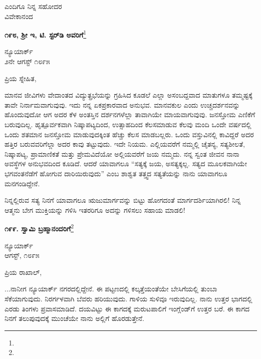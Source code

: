 \vspace{-0.5cm}

{\flushright
ಎಂದಿಗೂ ನಿನ್ನ ಸಹೋದರ\\ವಿವೇಕಾನಂದ\par}

\begin{center}
\textbf{೧೯೮, ಶ‍್ರೀ ಇ, ಟಿ. ಸ್ಟರ್‌ಡಿ ಅವರಿಗೆ}\footnote{}
\end{center}

\vspace{-0.5cm}

\begin{flushright}
ನ್ಯೂಯಾರ್ಕ್\\೨ನೇ ಆಗಸ್ಟ್ ೧೮೯೫
\end{flushright}

\noindent
ಪ್ರಿಯ ಸ್ನೇಹಿತ,

ಮಾನವ ಜೀವಿಗಳು ವೇದಾಂತದ ವಿದ್ಯುತ್ಪ್ರಭೆಯನ್ನು ಗ್ರಹಿಸಿದ ಕೂಡಲೆ ಎಲ್ಲಾ ಅಸಂಬದ್ದವಾದ ಮಾತುಗಳೂ ತಮ್ಮಷ್ಟಕ್ಕೆ ತಾವೇ ನಿರ್ನಾಮವಾಗುವುವು. ಇದು ನನ್ನ ಏಕ\break ಪ್ರಕಾರವಾದ ಅನುಭವ. ಮಾನವಕುಲ ಎಂದು ಉಚ್ಚದರ್ಶನವನ್ನು ಹೊಂದುವುದೋ ಆಗ ಅದರ ಕೆಳ ಅಂತಸ್ತಿನ ದರ್ಶನಗಳೆಲ್ಲಾ ತಾವಾಗಿಯೇ ಮಾಯವಾಗುವುವು. ಜನಸ್ತೋಮ ಎಣಿಕೆಗೆ ಬರುವುದಿಲ್ಲ. ಹೃತ್ಪೂರ್ವಕವಾಗಿ ನಿಷ್ಕಾಪಟ್ಯದಿಂದ, ಉತ್ಸಾಹದಿಂದ ಕೆಲಸ\break ಮಾಡುವ ಕೆಲವು ಮಂದಿ ಒಂದೇ ವರ್ಷದಲ್ಲಿ ಒಂದು ಶತಮಾನ ಜನಸ್ತೋಮ ಮಾಡುವುದಕ್ಕಿಂತ ಹೆಚ್ಚು ಕೆಲಸ ಮಾಡಬಲ್ಲರು. ಒಂದು ವಸ್ತುವಿನಲ್ಲಿ ಕಾವಿದ್ದರೆ ಅದರ ಹತ್ತಿರ ಬರುವವರಿಗೆಲ್ಲಾ ಅದರ ಕಾವು ತಟ್ಟುವುದು. ಇದೇ ನಿಯಮ. ಎಲ್ಲಿಯವರೆಗೆ ನಮ್ಮಲ್ಲಿ ಚೈತನ್ಯ, ಸತ್ಯಶೀಲತೆ, ನಿಷ್ಕಾಪಟ್ಯ, ಪ್ರಾಮಾಣಿಕತೆ ಮತ್ತು ಪ್ರೇಮವಿದೆಯೋ ಅಲ್ಲಿಯವರೆಗೆ ಜಯ ನಮ್ಮದು. ನನ್ನ ಸ್ವಂತ ಜೀವನ ನಾನಾ ಅವಸ್ಥೆಗಳ ಅನುಭವದಿಂದ ಕೂಡಿದೆ. ಆದರೆ ಯಾವಾಗಲೂ ``ಸತ್ಯಕ್ಕೆ ಜಯ, ಅಸತ್ಯಕ್ಕಲ್ಲ. ಸತ್ಯದ ಮೂಲಕವಾಗಿಯೇ ಭಗವಂತನೆಡೆಗೆ ಹೋಗುವ ದಾರಿಯಿರುವುದು” ಎಂಬ ಶಾಶ್ವತ ತತ್ತ್ವದ ಸತ್ಯತೆಯನ್ನು ನಾನು ಯಾವಾಗಲೂ ಮನಗಂಡಿದ್ದೇನೆ.

ನಿನ್ನಲ್ಲಿರುವ ಸತ್ಯ ನಿನಗೆ ಯಾವಾಗಲೂ ಋಜುಮಾರ್ಗವನ್ನು ಬಿಟ್ಟು ಹೋಗದಂತೆ ಮಾರ್ಗದರ್ಶಿಯಾಗಿರಲಿ! ನಿನ್ನ ಆತ್ಮನು ಬೇಗ ಮುಕ್ತಿಯನ್ನು ಗಳಿಸಿ ಇತರರಿಗೂ ಅದನ್ನು ಗಳಿಸಲು ಸಹಾಯ ಮಾಡಲಿ!

\begin{center}
\textbf{೧೯೯. ಸ್ವಾಮಿ ಬ್ರಹ್ಮಾನಂದರಿಗೆ}\footnote{}
\end{center}

\vspace{-0.3cm}

\begin{flushright}
ನ್ಯೂಯಾರ್ಕ್\\ಆಗಸ್ಟ್, ೧೮೯೫
\end{flushright}

\noindent
ಪ್ರಿಯ ರಾಖಾಲ್,

...ನಾನೀಗ ನ್ಯೂಯಾರ್ಕ್ ನಗರದಲ್ಲಿದ್ದೇನೆ. ಈ ಪಟ್ಟಣದಲ್ಲಿ ಕಲ್ಕತ್ತೆಯಂತೆಯೇ ಬೇಸಿಗೆಯಲ್ಲಿ ತುಂಬಾ ಸೆಕೆಯಾಗುವುದು. ನಿರರ್ಗಳವಾಗಿ ಬೆವರು ಹರಿಯುವುದು. ಗಾಳಿಯ ಸುಳಿವೂ ಇರುವುದಿಲ್ಲ. ನಾನು ಉತ್ತರ ಭಾಗದಲ್ಲಿ ಎರಡು ತಿಂಗಳು ಪ್ರವಾಸಮಾಡಿದೆ. ದಯವಿಟ್ಟು ಈ ಕಾಗದಕ್ಕೆ ಮರುಟಪಾಲಿಗೆ ಇಂಗ್ಲೆಂಡ್‌ಗೆ ಉತ್ತರ ಬರೆ. ಈ ಕಾಗದ ನಿನಗೆ ತಲುಪುವುದಕ್ಕೆ ಮುಂಚೆಯೇ ನಾನು ಅಲ್ಲಿಗೆ ಹೊರಡುತ್ತೇನೆ.


